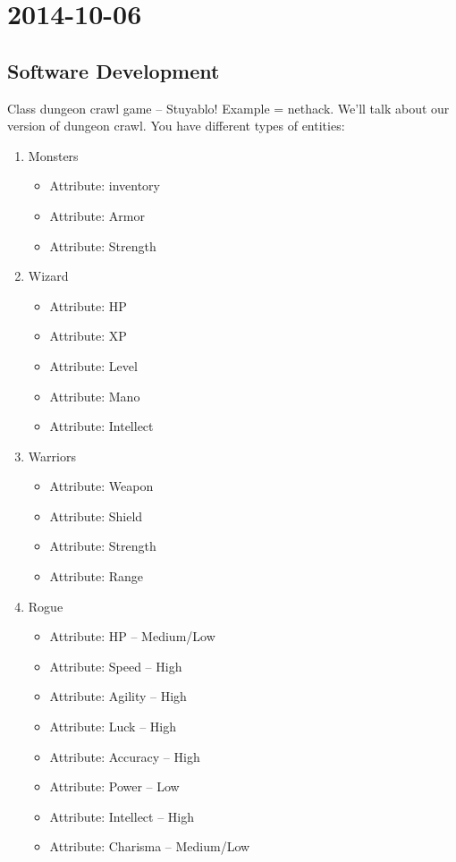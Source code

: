 \documentclass [12 pt, twoside] {article}
\begin{document}
\section{2014-10-06}
\subsection{Software Development}


Class dungeon crawl game -- Stuyablo! Example = nethack.
We'll talk about our version of dungeon crawl.
You have different types of entities:
\begin{enumerate}
	\item Monsters
		\begin{itemize}
			\item Attribute: inventory
			\item Attribute: Armor
			\item Attribute: Strength
		\end{itemize}
	\item Wizard
		\begin{itemize}
			\item Attribute: HP
			\item Attribute: XP
			\item Attribute: Level
			\item Attribute: Mano
			\item Attribute: Intellect
		\end{itemize}
	\item Warriors
		\begin{itemize}
			\item Attribute: Weapon
			\item Attribute: Shield
			\item Attribute: Strength
			\item Attribute: Range
		\end{itemize}
	\item Rogue
		\begin{itemize}
			\item Attribute: HP -- Medium/Low
			\item Attribute: Speed -- High
			\item Attribute: Agility -- High
			\item Attribute: Luck -- High
			\item Attribute: Accuracy -- High
			\item Attribute: Power -- Low
			\item Attribute: Intellect -- High
			\item Attribute: Charisma -- Medium/Low

\end{itemize}
\end{enumerate}
\end{document}
